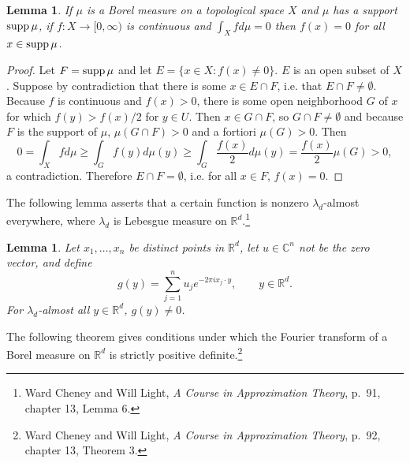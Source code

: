 \documentclass{article}
\newcommand{\supp}{\ensuremath\mathrm{supp}\,}
\newtheorem{lemma}[theorem]{Lemma}
\theoremstyle{definition}
\begin{document}
\begin{lemma}
 If $\mu$ is a Borel measure on a topological space $X$ and $\mu$ has a support
 $\supp \mu$, if $f:X \to [0,\infty)$ is continuous and $\int_X f d\mu=0$ then $f(x)=0$ for all
 $x \in \supp \mu$. 
 \label{supplemma}
 \end{lemma}
 \begin{proof}
 Let $F = \supp \mu$ and let $E=\{x \in X: f(x) \neq 0\}$. $E$ is an open subset of $X$. Suppose by contradiction
 that there is some $x \in E \cap F$, i.e. that $E \cap F \neq  \emptyset$. Because $f$ is continuous and $f(x)>0$,
 there is some open neighborhood $G$ of $x$ for which $f(y) > f(x)/2$ for $y \in U$. 
Then $x \in G \cap F$, so $G \cap F \neq \emptyset$ and because $F$ is the support of $\mu$,
$\mu(G \cap F)>0$ and a fortiori $\mu(G)>0$. Then
\[
0=\int_X f d\mu \geq \int_G f(y) d\mu(y) \geq \int_G \frac{f(x)}{2} d\mu(y)
=\frac{f(x)}{2} \mu(G)>0, 
\]
 a contradiction. Therefore $E \cap F = \emptyset$, i.e. for all $x \in F$, $f(x)=0$. 
 \end{proof}
 
 
The following lemma asserts that a certain function is nonzero $\lambda_d$-almost everywhere, where $\lambda_d$ is Lebesgue
measure on $\mathbb{R}^d$.\footnote{Ward Cheney and Will Light, {\em A Course
in Approximation Theory}, p.~91, chapter 13, Lemma 6.}
 
\begin{lemma}
Let $x_1,\ldots,x_n$ be distinct points in $\mathbb{R}^d$, let $u \in \mathbb{C}^n$ not be the zero vector, and define
\[
g(y) = \sum_{j=1}^n u_j e^{-2\pi ix_j \cdot y}, \qquad y \in \mathbb{R}^d.
\]
For $\lambda_d$-almost all $y \in \mathbb{R}^d$, $g(y) \neq 0$.
 \label{lebesguelemma}
\end{lemma}


 
The following theorem gives conditions under which the Fourier transform of a Borel measure on $\mathbb{R}^d$ is strictly
positive definite.\footnote{Ward Cheney and Will Light, {\em A Course
in Approximation Theory}, p.~92, chapter 13, Theorem 3.}
\end{document}
